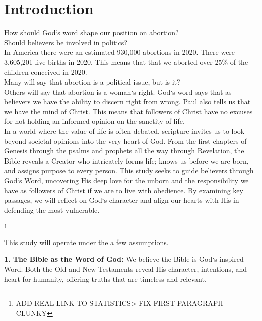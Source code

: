 \chapter{Introduction}
\begin{fullwidth}
How should God`s word shape our position on abortion?\\
Should believers be involved in politics?\\

In America there were an estimated 930,000 abortions in 2020. There were 3,605,201 live births in 2020. This means that 
that we aborted over 25\% of the children conceived in 2020.\\ Many will say that abortion is a political issue, but is it?\\  Others will say that abortion is a woman`s right. 
God`s word says that as believers we have the ability to discern right from wrong. Paul also tells us that we have the mind of Christ. This means that followers of Christ have no 
excuses for not holding an informed opinion on the sanctity of life.\\

In a world where the value of life is often debated, scripture invites us to look beyond societal opinions into the very heart of God. 
From the first chapters of Genesis through the psalms and prophets all the way through Revelation, the Bible reveals a Creator who intricately forms life;
knows us before we are born, and assigns purpose to every person. This study seeks to guide believers through God`s Word, uncovering His deep love for the unborn and the 
responsibility we have as followers of Christ if we are to live with obedience.  By examining key passages, we will reflect on God`s character 
and align our hearts with His in defending the most vulnerable. \\
\end{fullwidth}
\vspace{1\baselineskip}
\footnote{ADD REAL LINK TO STATISTICS> FIX FIRST PARAGRAPH - CLUNKY}

This study will operate under the a few assumptions.
\vspace{1\baselineskip}

\textbf{1. The Bible as the Word of God:} 
We believe the Bible is God`s inspired Word. Both the Old and New Testaments reveal His character, intentions, and heart for humanity, offering truths that are timeless and relevant.
\vspace{2\baselineskip}


